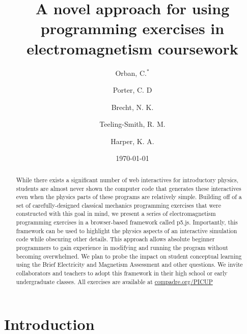 \documentclass[aps,prd,10pt,twocolumn,showpacs,preprintnumbers,amsmath,amssymb,nofootinbib,floatfix]{revtex4-1}
\begin{document}
\title{A novel approach for using programming exercises in electromagnetism coursework}

\author{Orban, C.$^*$}
\author{Porter, C. D}
\author{Brecht, N. K.}
\author{Teeling-Smith, R. M.}
\author{Harper, K. A.}


\date{\today}

\begin{abstract}
While there exists a significant number of web interactives for introductory physics, students are almost never shown the computer code that generates these interactives even when the physics parts of these programs are relatively simple. Building off of a set of carefully-designed classical mechanics programming exercises that were constructed with this goal in mind, we present a series of electromagnetism programming exercises in a browser-based framework called p5.js. Importantly, this framework can be used to highlight the physics aspects of an interactive simulation code while obscuring other details. This approach allows absolute beginner programmers to gain experience in modifying and running the program without becoming overwhelmed. We plan to probe the impact on student conceptual learning using the Brief Electricity and Magnetism Assessment and other questions. We invite collaborators and teachers to adopt this framework in their high school or early undergraduate classes. All exercises are available at \href{http://compadre.org/PICUP}{compadre.org/PICUP}
\end{abstract}

\maketitle

\section{Introduction}
\end{document}
